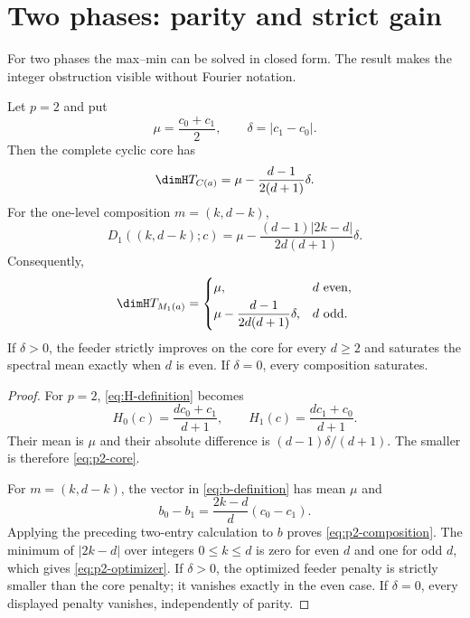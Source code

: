 \section{Two phases: parity and strict gain}
\label{sec:two-phase}

For two phases the max--min can be solved in closed form.  The result makes
the integer obstruction visible without Fourier notation.

\begin{theorem}
\label{thm:two-phase}
Let $p=2$ and put
\[
 \mu=\frac{c_0+c_1}{2},
 \qquad
 \delta=|c_1-c_0|.
\]
Then the complete cyclic core has
\begin{equation}
 \dimH T_{C(a)}
 =\mu-\frac{d-1}{2(d+1)}\delta.
 \label{eq:p2-core}
\end{equation}
For the one-level composition $m=(k,d-k)$,
\begin{equation}
 D_1((k,d-k);c)
 =\mu-\frac{(d-1)|2k-d|}{2d(d+1)}\delta.
 \label{eq:p2-composition}
\end{equation}
Consequently,
\begin{equation}
 \dimH T_{M_1(a)}=
 \begin{cases}
 \mu, & d\text{ even},\\[1mm]
 \displaystyle \mu-\frac{d-1}{2d(d+1)}\delta,
     & d\text{ odd}.
 \end{cases}
 \label{eq:p2-optimizer}
\end{equation}
If $\delta>0$, the feeder strictly improves on the core for every $d\geq2$
and saturates the spectral mean exactly when $d$ is even.  If $\delta=0$,
every composition saturates.
\end{theorem}

\begin{proof}
For $p=2$, \eqref{eq:H-definition} becomes
\[
 H_0(c)=\frac{dc_0+c_1}{d+1},
 \qquad
 H_1(c)=\frac{dc_1+c_0}{d+1}.
\]
Their mean is $\mu$ and their absolute difference is
$(d-1)\delta/(d+1)$.  The smaller is therefore
\eqref{eq:p2-core}.

For $m=(k,d-k)$, the vector in \eqref{eq:b-definition} has mean $\mu$ and
\[
 b_0-b_1=\frac{2k-d}{d}(c_0-c_1).
\]
Applying the preceding two-entry calculation to $b$ proves
\eqref{eq:p2-composition}.  The minimum of $|2k-d|$ over integers
$0\leq k\leq d$ is zero for even $d$ and one for odd $d$, which gives
\eqref{eq:p2-optimizer}.  If $\delta>0$, the optimized feeder penalty is
strictly smaller than the core penalty; it vanishes exactly in the even case.
If $\delta=0$, every displayed penalty vanishes, independently of parity.
\end{proof}

